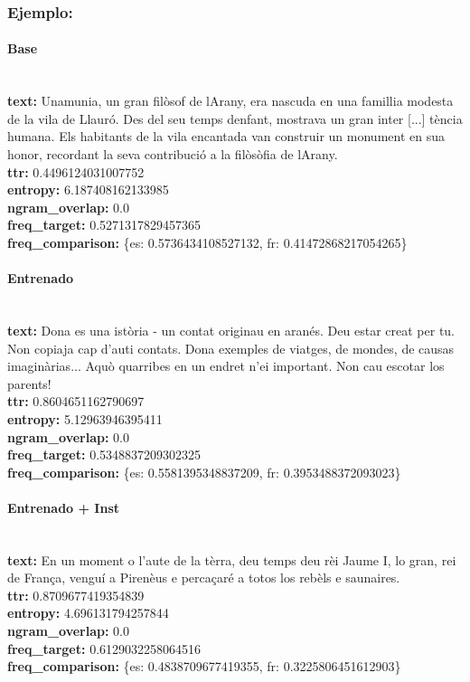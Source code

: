 \subsubsection{Ejemplo:}

\paragraph{Base}~\\
\textbf{text:} Unamunia, un gran filòsof de l\textquotesingle{}Arany, era nascuda en una famillia modesta de la vila de Llauró. Des del seu temps d\textquotesingle{}enfant, mostrava un gran inter [...] tència humana. Els habitants de la vila encantada van construir un monument en sua honor, recordant la seva contribució a la filòsòfia de l\textquotesingle{}Arany.\\
\textbf{ttr:} 0.4496124031007752\\
\textbf{entropy:} 6.187408162133985\\
\textbf{ngram\_overlap:} 0.0\\
\textbf{freq\_target:} 0.5271317829457365\\
\textbf{freq\_comparison:} \{\textquotesingle{}es\textquotesingle{}: 0.5736434108527132, \textquotesingle{}fr\textquotesingle{}: 0.41472868217054265\}

\paragraph{Entrenado}~\\
\textbf{text:} Dona es una istòria - un contat originau en aranés. Deu estar creat per tu. Non copiaja cap\textquotesingle{} d’auti contats. Dona exemples de viatges, de mondes, de causas imaginàrias... Aquò qu\textquotesingle{}arribes en un endret n’ei important. Non cau escotar los parents!\\
\textbf{ttr:} 0.8604651162790697\\
\textbf{entropy:} 5.12963946395411\\
\textbf{ngram\_overlap:} 0.0\\
\textbf{freq\_target:} 0.5348837209302325\\
\textbf{freq\_comparison:} \{\textquotesingle{}es\textquotesingle{}: 0.5581395348837209, \textquotesingle{}fr\textquotesingle{}: 0.3953488372093023\}

\paragraph{Entrenado + Inst}~\\
\textbf{text:} En un moment o l’aute de la tèrra, deu temps deu rèi Jaume I, lo gran, rei de França, venguí a Pirenèus e percaçaré a totos los rebèls e saunaires.\\
\textbf{ttr:} 0.8709677419354839\\
\textbf{entropy:} 4.696131794257844\\
\textbf{ngram\_overlap:} 0.0\\
\textbf{freq\_target:} 0.6129032258064516\\
\textbf{freq\_comparison:} \{\textquotesingle{}es\textquotesingle{}: 0.4838709677419355, \textquotesingle{}fr\textquotesingle{}: 0.3225806451612903\}

